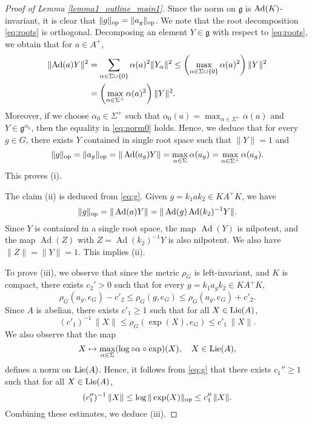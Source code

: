 \documentclass[11pt,reqno,a4paper]{amsart}
\numberwithin{equation}{section}
\newcommand{\gog}{\mathfrak{g}}
\DeclareMathOperator{\Ad}{Ad}
\theoremstyle{theorem}
\theoremstyle{definition}
\begin{document}
\begin{proof}[Proof of Lemma \ref{lemma1_outline_main1}]
Since the norm on $\gog$ is $\hbox{Ad}(K)$-invariant, it is clear that
$\|g\|_{\rm op}=\|a_g\|_{\rm op}$. 
We note that the root decomposition \eqref{eq:roots} is orthogonal.
Decomposing an element $Y\in \gog$ with respect to \eqref{eq:roots}, we obtain that for $a\in A^+$,
\begin{align}\label{eq:norm0}
\|\hbox{Ad}(a)Y\|^2&=\sum_{\alpha\in \Sigma\cup \{0\}} \alpha(a)^2\|Y_\alpha\|^2\le \left(\max_{\alpha \in \Sigma\cup\{0\}} \alpha(a)^2\right) \|Y\|^2\\
&=
\left(\max_{\alpha \in \Sigma^+} \alpha(a)^2\right) \|Y\|^2.\nonumber
\end{align}
Moreover, if we choose $\alpha_0\in \Sigma^+$ such that 
$\alpha_0(a)=\max_{\alpha \in \Sigma^+} \alpha(a)$
and $Y\in \gog^{\alpha_0}$, then the equality in \eqref{eq:norm0} holds.
Hence, we deduce that for every $g\in G$, there exists $Y$ contained in
single root space such that $\|Y\|=1$ and
\begin{equation}
\label{eq:g}
\|g\|_{\rm op} =\|a_g\|_{\rm op}= \|\Ad(a_g)Y\| = \max_{\alpha \in \Sigma} \alpha(a_g)= \max_{\alpha \in \Sigma^+} \alpha(a_g).
\end{equation}
This proves (i).

The claim (ii) is deduced from \eqref{eq:g}. Given $g=k_1ak_2 \in KA^+K$, we have 
$$
\|g\|_{\rm op}=\|\Ad(a)Y\|=\|\Ad(g) \Ad(k_2)^{-1}Y\|.
$$
Since $Y$ is contained in a single root space, the map $\Ad(Y)$ is nilpotent,
 and the map $\Ad(Z)$ with $Z=\Ad(k_2)^{-1}Y$ is also nilpotent. 
 We also have $\|Z\|=\|Y\|=1$. This implies (ii).


To prove (iii), we observe that since the metric $\rho_G$ is left-invariant, and $K$ is compact, there exists $c_2'>0$ such that for every $g=k_1a_gk_2\in KA^+K$, 
$$
\rho_G(a_g,e_G)-c'_2\le \rho_G(g,e_G)\le \rho_G(a_g,e_G)+c'_2.
$$
Since $A$ is abelian, there exists $c'_1\ge 1$ such that for all $X\in \hbox{Lie}(A)$,
$$
(c'_1)^{-1}\, \|X\|\le \rho_G(\exp(X),e_G)\le c'_1\, \|X\|.
$$
We also observe that the map
$$
X\mapsto \max_{\alpha\in\Sigma} (\log\circ \alpha\circ \exp)(X),\quad X\in\hbox{Lie}(A),
$$
defines a norm on $\hbox{Lie}(A)$. Hence, it follows from \eqref{eq:g}
that there exists $c_1''\ge 1$ such that
for all $X\in\hbox{Lie}(A)$,
$$
(c''_1)^{-1}\, \|X\|\le \log\|\exp(X)\|_{\rm op} \le c''_1\, \|X\|.
$$
Combining these estimates, we deduce (iii).


\end{proof}
\end{document}
